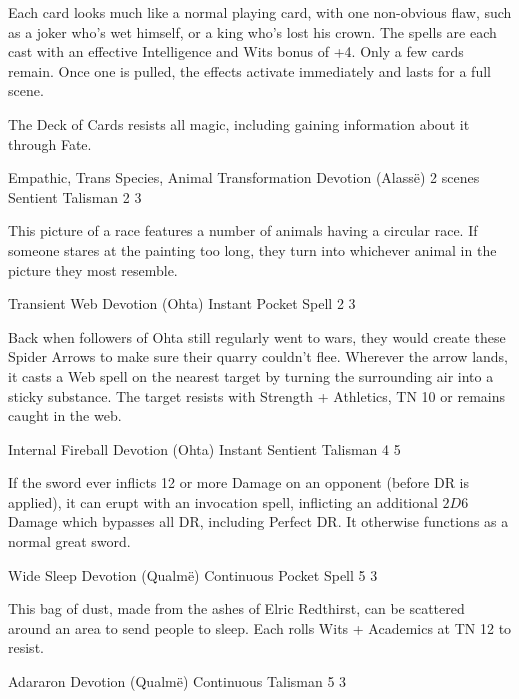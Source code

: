 \begin{multicols}{2}
Each card looks much like a normal playing card, with one non-obvious flaw, such as a joker who's wet himself, or a king who's lost his crown.  The spells are each cast with an effective Intelligence and Wits bonus of +4.  Only a few cards remain.  Once one is pulled, the effects activate immediately and lasts for a full scene.

The Deck of Cards resists all magic, including gaining information about it through Fate.

	{Empathic, Trans Species, Animal Transformation}%
	{Devotion (Alass\"e)}%
	{2 scenes}%
	{Sentient Talisman}%
	{2}%
	{3}

This picture of a race features a number of animals having a circular race.
If someone stares at the painting too long, they turn into whichever animal in the picture they most resemble.

	{Transient Web}%
	{Devotion (Ohta)}%
	{Instant}%
	{Pocket Spell}%
	{2}%
	{3}
\label{spiderarrows}%

Back when followers of Ohta still regularly went to wars, they would create these Spider Arrows to make sure their quarry couldn't flee.
Wherever the arrow lands, it casts a Web spell on the nearest target by turning the surrounding air into a sticky substance.
The target resists with Strength + Athletics, TN 10 or remains caught in the web.

	{Internal Fireball}%
	{Devotion (Ohta)}%
	{Instant}%
	{Sentient Talisman}%
	{4}%
	{5}%
\label{godslayer}

If the sword ever inflicts 12 or more Damage on an opponent (before DR is applied), it can erupt with an invocation spell, inflicting an additional $2D6$ Damage which bypasses all DR, including Perfect DR.
It otherwise functions as a normal great sword.

	{Wide Sleep}%
	{Devotion (Qualm\"e)}%
	{Continuous}%
	{Pocket Spell}%
	{5}%
	{3}%

This bag of dust, made from the ashes of Elric Redthirst, can be scattered around an area to send people to sleep.
Each rolls Wits + Academics at TN 12 to resist.

	{Adararon}%
	{Devotion (Qualm\"e)}%
	{Continuous}%
	{Talisman}%
	{5}%
	{3}%


\end{multicols}
